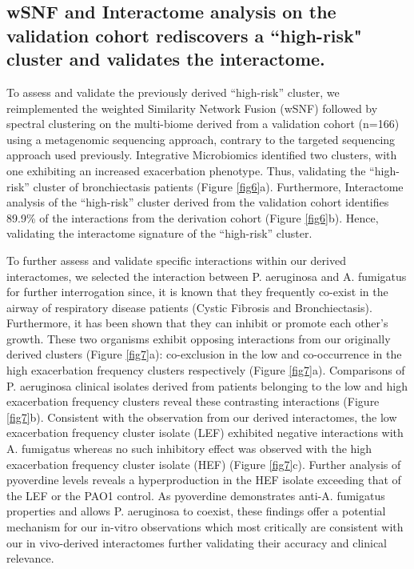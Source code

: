 \subsection{wSNF and Interactome analysis on the validation cohort rediscovers a ``high-risk" cluster and validates the interactome.}

To assess and validate the previously derived “high-risk” cluster, we reimplemented the weighted Similarity Network Fusion (wSNF) followed by spectral clustering on the multi-biome derived from a validation cohort (n=166) using a metagenomic sequencing approach, contrary to the targeted sequencing approach used previously. Integrative Microbiomics identified two clusters, with one exhibiting an increased exacerbation phenotype. Thus, validating the “high-risk” cluster of bronchiectasis patients (Figure \ref{fig6}a). Furthermore, Interactome analysis of the “high-risk” cluster derived from the validation cohort identifies 89.9\% of the interactions from the derivation cohort (Figure \ref{fig6}b). Hence, validating the interactome signature of the “high-risk” cluster.

To further assess and validate specific interactions within our derived interactomes, we selected the interaction between P. aeruginosa and A. fumigatus for further interrogation since, it is known that they frequently co-exist in the airway of respiratory disease patients (Cystic Fibrosis and Bronchiectasis). Furthermore, it has been shown that they can inhibit \cite{Ferreira2015,Reece2018} or promote \cite{Briard2016,Margalit2020} each other’s growth. These two organisms exhibit opposing interactions from our originally derived clusters (Figure \ref{fig7}a): co-exclusion in the low and co-occurrence in the high exacerbation frequency clusters respectively (Figure \ref{fig7}a). Comparisons of P. aeruginosa clinical isolates derived from patients belonging to the low and high exacerbation frequency clusters reveal these contrasting interactions (Figure \ref{fig7}b). Consistent with the observation from our derived interactomes, the low exacerbation frequency cluster isolate (LEF) exhibited negative interactions with A. fumigatus whereas no such inhibitory effect was observed with the high exacerbation frequency cluster isolate (HEF) (Figure \ref{fig7}c). Further analysis of pyoverdine levels reveals a hyperproduction in the HEF isolate exceeding that of the LEF or the PAO1 control. As pyoverdine demonstrates anti-A. fumigatus properties and allows P. aeruginosa to coexist, these findings offer a potential mechanism for our in-vitro observations which most critically are consistent with our in vivo-derived interactomes further validating their accuracy and clinical relevance.\\

